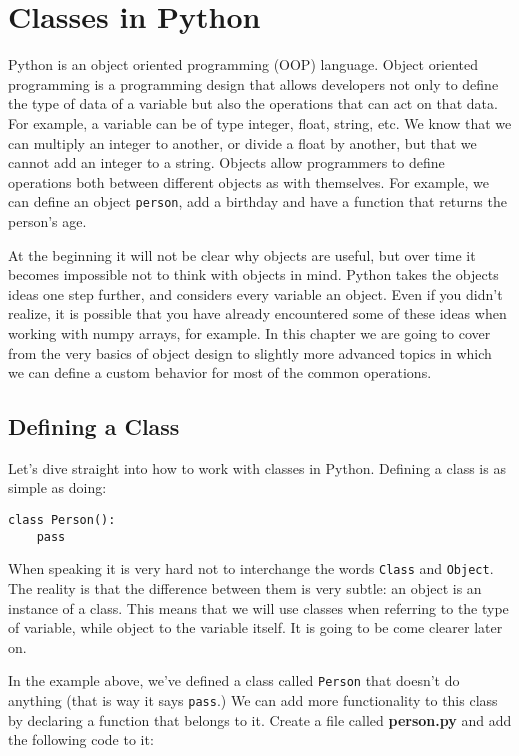 \chapter{Classes in Python}\label{classes-in-python}
Python is an object oriented programming (OOP) language. Object oriented
programming is a programming design that allows developers not only to
define the type of data of a variable but also the operations that can
act on that data. For example, a variable can be of type integer, float,
string, etc. We know that we can multiply an integer to another, or
divide a float by another, but that we cannot add an integer to a
string. Objects allow programmers to define operations both between
different objects as with themselves. For example, we can define an object
\texttt{person}, add a birthday and have a function that returns the
person's age.

At the beginning it will not be clear why objects are useful, but over
time it becomes impossible not to think with objects in mind. Python
takes the objects ideas one step further, and considers every variable
an object. Even if you didn't realize, it is possible that you have
already encountered some of these ideas when working with numpy arrays,
for example. In this chapter we are going to cover from the very basics
of object design to slightly more advanced topics in which we can define a 
custom behavior for most of the common operations.

\section{Defining a Class}\label{defining-a-class}
Let's dive straight into how to work with classes in Python. Defining a class is as
simple as doing:

\begin{verbatim}
class Person():
    pass
\end{verbatim}

When speaking it is very hard not to interchange the words
\texttt{Class} and \texttt{Object}. The reality is that the difference
between them is very subtle: an object is an instance of a class. This
means that we will use classes when referring to the type of variable,
while object to the variable itself. It is going to be come clearer
later on.

In the example above, we've defined a class called \texttt{Person} that doesn't do
anything (that is way it says \texttt{pass}.) We can add more
functionality to this class by declaring a function that belongs to it. Create a file called \textbf{person.py} and add the following code to it:

